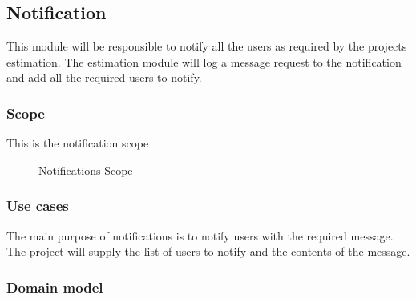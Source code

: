 \subsection{Notification}
This module will be responsible to notify all the users as required by the projects estimation. The estimation module will log a message request to the notification and add all the required users to notify.
\subsubsection{Scope}
This is the notification scope
	\begin{figure}[H]
	    	\centering
	    	\caption{Notifications Scope}
	    	\label{fig:Notification_Scope}
   	\end{figure}
\subsubsection{Use cases}
The main purpose of notifications is to notify users with the required message. The project will supply the list of users to notify and the contents of the message.
\subsubsection{Domain model}
